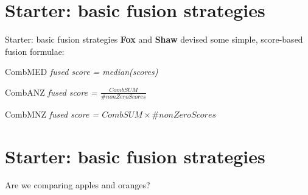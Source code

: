 \documentclass{beamer}
\begin{document}
        \section{Starter: basic fusion strategies}

	\begin{frame}{Starter: basic fusion strategies}
                \textbf {Fox} and \textbf{Shaw} devised some simple, score-based fusion formulae:
		\begin{block}{CombMED}
		       \textit{fused score = median(scores)} 
		\end{block}

		\begin{alertblock}{CombANZ}
		       \textit{fused score = $\frac{CombSUM}{\#nonZeroScores}$}   
		\end{alertblock}

		\begin{exampleblock}{CombMNZ}
		       \textit{fused score = $CombSUM \times \#nonZeroScores$}  
		\end{exampleblock}
	\end{frame}

        \section{Starter: basic fusion strategies}

        \begin{frame}{Are we comparing apples and oranges?}
               
	\end{frame}
\end{document}
